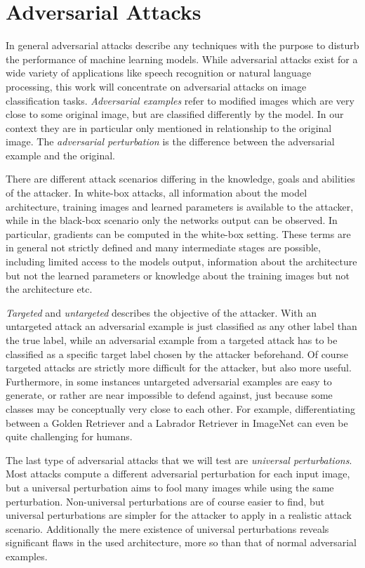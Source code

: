 
\section{Adversarial Attacks}
\label{sec:attacks}

In general adversarial attacks describe any techniques with the purpose to disturb the performance of machine learning models.
While adversarial attacks exist for a wide variety of applications like speech recognition or natural language processing, this work will concentrate on adversarial attacks on image classification tasks.
\emph{Adversarial examples} refer to modified images which are very close to some original image, but are classified differently by the model.
In our context they are in particular only mentioned in relationship to the original image.
The \emph{adversarial perturbation} is the difference between the adversarial example and the original.

There are different attack scenarios differing in the knowledge, goals and abilities of the attacker.
In white-box attacks, all information about the model architecture, training images and learned parameters is available to the attacker, while in the black-box scenario only the networks output can be observed.
In particular, gradients can be computed in the white-box setting.
These terms are in general not strictly defined and many intermediate stages are possible, including limited access to the models output, information about the architecture but not the learned parameters or knowledge about the training images but not the architecture etc.

\emph{Targeted} and \emph{untargeted} describes the objective of the attacker.
With an untargeted attack an adversarial example is just classified as any other label than the true label, while an adversarial example from a targeted attack has to be classified as a specific target label chosen by the attacker beforehand.
Of course targeted attacks are strictly more difficult for the attacker, but also more useful.
Furthermore, in some instances untargeted adversarial examples are easy to generate, or rather are near impossible to defend against, just because some classes may be conceptually very close to each other.
For example, differentiating between a Golden Retriever and a Labrador Retriever in ImageNet \citep{imagenet} can even be quite challenging for humans.

The last type of adversarial attacks that we will test are \emph{universal perturbations}.
Most attacks compute a different adversarial perturbation for each input image, but a universal perturbation aims to fool many images while using the same perturbation.
Non-universal perturbations are of course easier to find, but universal perturbations are simpler for the attacker to apply in a realistic attack scenario.
Additionally the mere existence of universal perturbations reveals significant flaws in the used architecture, more so than that of normal adversarial examples.

